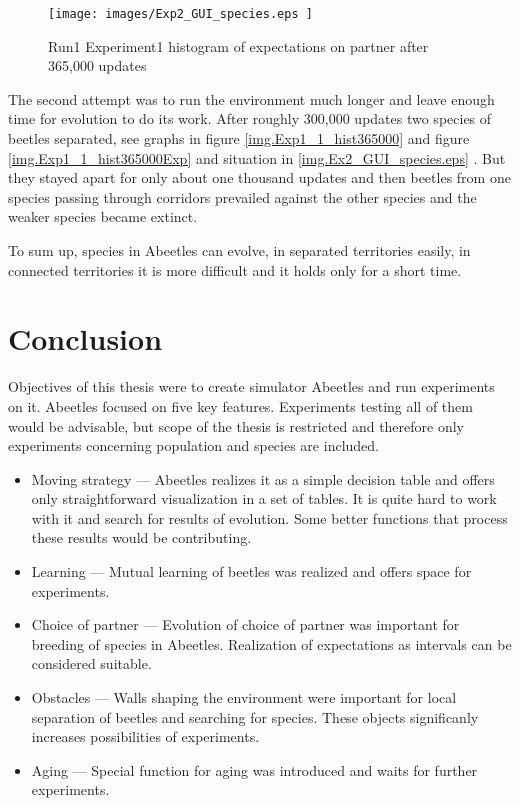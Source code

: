 \documentclass[a4paper,12pt]{report}
\begin{document}
\begin{figure}
\begin{center}
  \texttt{[image: images/Exp2\_GUI\_species.eps ]}
  \caption{Run1 Experiment1 histogram of expectations on partner after 365,000 updates}
  \label{img.Exp2_GUI_species.eps}
\end{center}
\end{figure}
  
The second attempt was to run the environment much longer and leave enough time for evolution to do its work. After roughly 300,000 updates two species of beetles separated, see graphs in figure \ref{img.Exp1_1_hist365000} and figure \ref{img.Exp1_1_hist365000Exp} and situation in \ref{img.Ex2_GUI_species.eps} . But they stayed apart for only about one thousand updates and then beetles from one species passing through corridors prevailed against the other species and the weaker species became extinct. 

To sum up, species in Abeetles can evolve, in separated territories easily, in connected territories it is more difficult and it holds only for a short time.



\chapter{Conclusion}

Objectives of this thesis were to create simulator Abeetles and run experiments on it. Abeetles focused on five key features. Experiments testing all of them  would be advisable, but scope of the thesis is restricted and therefore only experiments concerning population and species are included.
  
\begin {itemize}
\item Moving strategy --- Abeetles realizes it as a simple decision table and offers only straightforward visualization in a set of tables. It is quite hard to work with it and search for results of evolution. Some better functions that process these results would be contributing. 
\item Learning --- Mutual learning of beetles was realized and offers space for experiments.
\item Choice of partner --- Evolution of choice of partner was important for breeding of species in Abeetles. Realization of expectations as intervals can be considered suitable.
\item Obstacles --- Walls shaping the environment were important for local separation of beetles and searching for species. These objects significanly increases possibilities of experiments.
\item Aging --- Special function for aging was introduced and waits for further experiments. 
\end{itemize}
\end{document}

